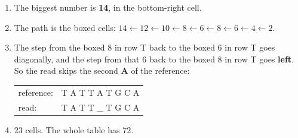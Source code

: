 \documentclass[12pt]{article}
\begin{document}
\bigskip
\begin{enumerate}
\item The biggest number is \textbf{14}, in the bottom-right cell.
\item The path is the boxed cells: $14 \leftarrow 12 \leftarrow 10 \leftarrow 8 \leftarrow 6 \leftarrow 8 \leftarrow 6 \leftarrow 4 \leftarrow 2$.
\item The step from the boxed 8 in row T back to the boxed 6 in row T goes diagonally, and the step from that 6 back to the boxed 8 in row T goes \textbf{left}. So the read skips the second \textbf{A} of the reference:

\begin{center}
\ttfamily
\begin{tabular}{@{}l@{\ \ }l@{}}
reference: & T A T T A T G C A \\
read:      & T A T T \_ T G C A
\end{tabular}
\end{center}

\item 23 cells. The whole table has 72.
\end{enumerate}
\end{document}
